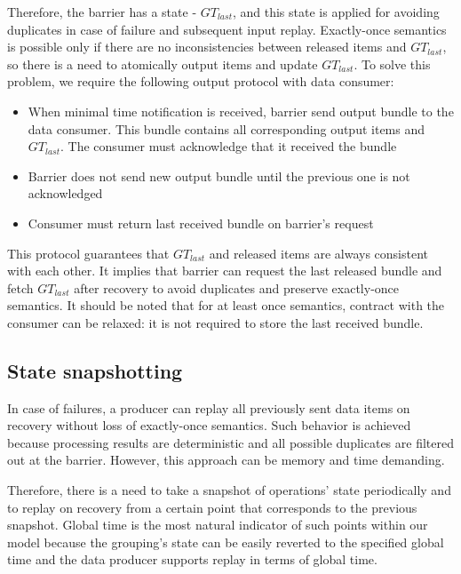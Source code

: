 Therefore, the barrier has a state - $GT_{last}$, and this state is applied for avoiding duplicates in case of failure and subsequent input replay. Exactly-once semantics is possible only if there are no inconsistencies between released items and $GT_{last}$, so there is a need to atomically output items and update $GT_{last}$. To solve this problem, we require the following output protocol with data consumer: 

\begin{itemize}
    \item When minimal time notification is received, barrier send output bundle to the data consumer. This bundle contains all corresponding output items and $GT_{last}$. The consumer must acknowledge that it received the bundle
    \item Barrier does not send new output bundle until the previous one is not acknowledged
    \item Consumer must return last received bundle on barrier's request 
\end{itemize}

This protocol guarantees that $GT_{last}$ and released items are always consistent with each other. It implies that barrier can request the last released bundle and fetch $GT_{last}$ after recovery to avoid duplicates and preserve exactly-once semantics. It should be noted that for at least once semantics, contract with the consumer can be relaxed: it is not required to store the last received bundle.

\subsection{State snapshotting}
In case of failures, a producer can replay all previously sent data items on recovery without loss of exactly-once semantics. Such behavior is achieved because processing results are deterministic and all possible duplicates are filtered out at the barrier. However, this approach can be memory and time demanding. 

Therefore, there is a need to take a snapshot of operations' state periodically and to replay on recovery from a certain point that corresponds to the previous snapshot. Global time is the most natural indicator of such points within our model because the grouping's state can be easily reverted to the specified global time and the data producer supports replay in terms of global time.   

